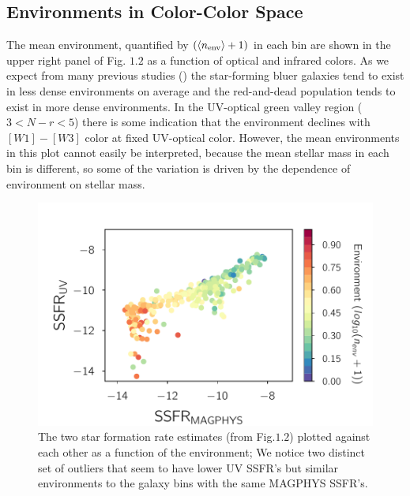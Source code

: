 \subsection{Environments in Color-Color Space}

The mean environment, quantified by $(\langle n_{\rm env}\rangle + 1)$
in each bin are shown in the upper right panel of Fig. $1.2$ 
as a function of optical and infrared colors. As we expect from 
many previous studies (\citealt{blanton_physical_2009}) 
the star-forming bluer galaxies tend  to exist in less dense 
environments on average and the  red-and-dead population tends to 
exist in more dense environments.  In the UV-optical green valley 
region ($3 < N-r < 5$) there is some indication that the 
environment declines with $[W1]-[W3]$ color at fixed UV-optical 
color. However, the mean environments in this plot cannot easily 
be interpreted, because the mean stellar mass in each bin is 
different, so some of the variation is driven by the dependence 
of environment on stellar mass.

\begin{figure}
\includegraphics[width=\textwidth]{figures/2_env_plot.pdf}
\caption[The Ultraviolet and MAGPHYS SSFR's plotted against each other as a function of the environment; We notice two distinct set of outliers that seem to have lower UV SSFR's but similar environments to the galaxy bins with the same MAGPHYS SSFR's]{The two star formation rate estimates (from Fig.$1.2$) plotted against each other as a function of the environment; We notice two distinct set of outliers that seem to have lower UV SSFR's but similar environments to the galaxy bins with the same MAGPHYS SSFR's.
\label{fig:env_uv_magphys}}
\end{figure}

